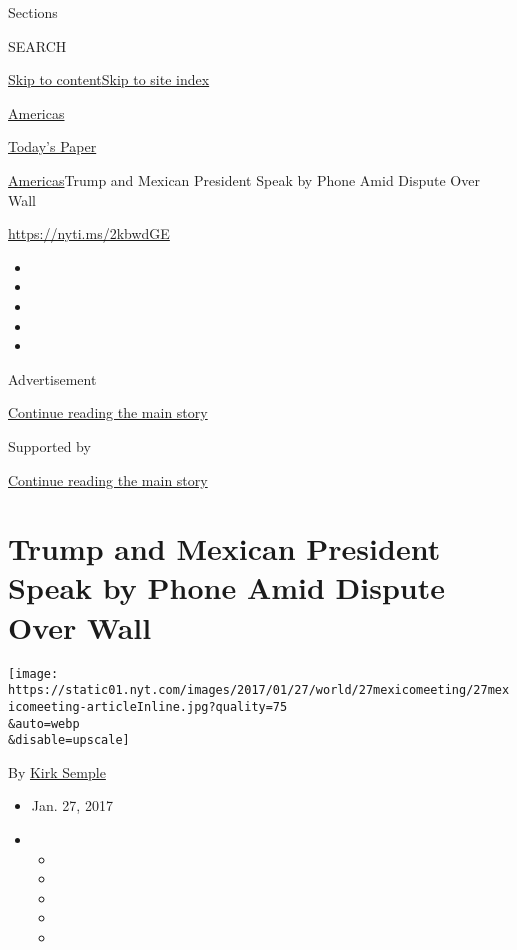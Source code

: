 Sections

SEARCH

\protect\hyperlink{site-content}{Skip to
content}\protect\hyperlink{site-index}{Skip to site index}

\href{https://www.nytimes.com/section/world/americas}{Americas}

\href{https://myaccount.nytimes.com/auth/login?response_type=cookie\&client_id=vi}{}

\href{https://www.nytimes.com/section/todayspaper}{Today's Paper}

\href{/section/world/americas}{Americas}\textbar{}Trump and Mexican
President Speak by Phone Amid Dispute Over Wall

\url{https://nyti.ms/2kbwdGE}

\begin{itemize}
\item
\item
\item
\item
\item
\end{itemize}

Advertisement

\protect\hyperlink{after-top}{Continue reading the main story}

Supported by

\protect\hyperlink{after-sponsor}{Continue reading the main story}

\hypertarget{trump-and-mexican-president-speak-by-phone-amid-dispute-over-wall}{%
\section{Trump and Mexican President Speak by Phone Amid Dispute Over
Wall}\label{trump-and-mexican-president-speak-by-phone-amid-dispute-over-wall}}

\texttt{[image: https://static01.nyt.com/images/2017/01/27/world/27mexicomeeting/27mexicomeeting-articleInline.jpg?quality=75\\\&auto=webp\\\&disable=upscale]}

By \href{http://www.nytimes.com/by/kirk-semple}{Kirk Semple}

\begin{itemize}
\item
  Jan. 27, 2017
\item
  \begin{itemize}
  \item
  \item
  \item
  \item
  \item
  \end{itemize}
\end{itemize}

